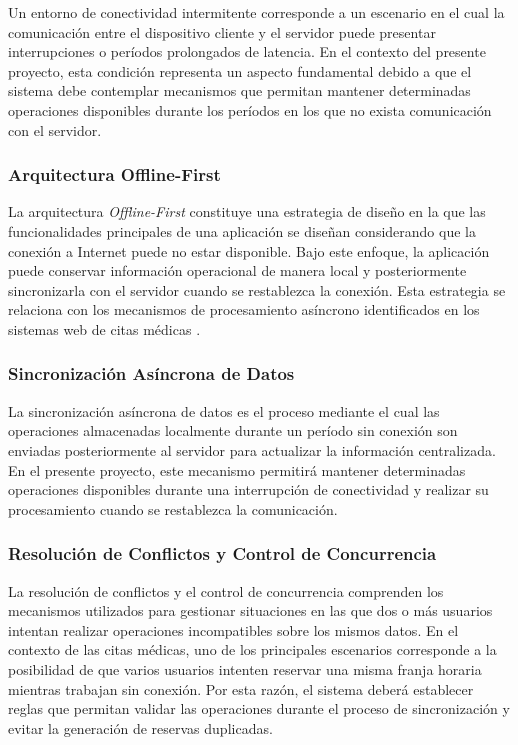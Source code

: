 Un entorno de conectividad intermitente corresponde a un escenario en el cual la comunicación entre el dispositivo cliente y el servidor puede presentar interrupciones o períodos prolongados de latencia. En el contexto del presente proyecto, esta condición representa un aspecto fundamental debido a que el sistema debe contemplar mecanismos que permitan mantener determinadas operaciones disponibles durante los períodos en los que no exista comunicación con el servidor.

\subsubsection{Arquitectura Offline-First}

La arquitectura \textit{Offline-First} constituye una estrategia de diseño en la que las funcionalidades principales de una aplicación se diseñan considerando que la conexión a Internet puede no estar disponible. Bajo este enfoque, la aplicación puede conservar información operacional de manera local y posteriormente sincronizarla con el servidor cuando se restablezca la conexión. Esta estrategia se relaciona con los mecanismos de procesamiento asíncrono identificados en los sistemas web de citas médicas \parencite{zhao2017}.

\subsubsection{Sincronización Asíncrona de Datos}

La sincronización asíncrona de datos es el proceso mediante el cual las operaciones almacenadas localmente durante un período sin conexión son enviadas posteriormente al servidor para actualizar la información centralizada. En el presente proyecto, este mecanismo permitirá mantener determinadas operaciones disponibles durante una interrupción de conectividad y realizar su procesamiento cuando se restablezca la comunicación.

\subsubsection{Resolución de Conflictos y Control de Concurrencia}

La resolución de conflictos y el control de concurrencia comprenden los mecanismos utilizados para gestionar situaciones en las que dos o más usuarios intentan realizar operaciones incompatibles sobre los mismos datos. En el contexto de las citas médicas, uno de los principales escenarios corresponde a la posibilidad de que varios usuarios intenten reservar una misma franja horaria mientras trabajan sin conexión. Por esta razón, el sistema deberá establecer reglas que permitan validar las operaciones durante el proceso de sincronización y evitar la generación de reservas duplicadas.

